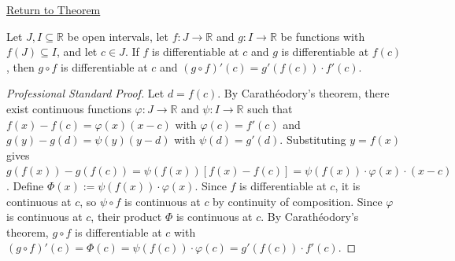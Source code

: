 \newpage
{}
\label{prf:chain-rule}

\begin{remark*}[Return]
\hyperref[thm:chain-rule]{Return to Theorem}
\end{remark*}

\begin{theorem*}
Let $J, I \subseteq \mathbb{R}$ be open intervals, let $f : J \to \mathbb{R}$ and $g : I \to \mathbb{R}$ be functions with $f(J) \subseteq I$, and let $c \in J$. If $f$ is differentiable at $c$ and $g$ is differentiable at $f(c)$, then $g \circ f$ is differentiable at $c$ and $(g \circ f)'(c) = g'(f(c)) \cdot f'(c)$.
\end{theorem*}

\begin{proof}[Professional Standard Proof]
\LRAProofBodyStart
Let $d = f(c)$. By Carath\'{e}odory's theorem, there exist continuous functions $\varphi : J \to \mathbb{R}$ and $\psi : I \to \mathbb{R}$ such that $f(x) - f(c) = \varphi(x)(x - c)$ with $\varphi(c) = f'(c)$ and $g(y) - g(d) = \psi(y)(y - d)$ with $\psi(d) = g'(d)$. Substituting $y = f(x)$ gives $g(f(x)) - g(f(c)) = \psi(f(x))[f(x) - f(c)] = \psi(f(x)) \cdot \varphi(x) \cdot (x - c)$. Define $\Phi(x) := \psi(f(x)) \cdot \varphi(x)$. Since $f$ is differentiable at $c$, it is continuous at $c$, so $\psi \circ f$ is continuous at $c$ by continuity of composition. Since $\varphi$ is continuous at $c$, their product $\Phi$ is continuous at $c$. By Carath\'{e}odory's theorem, $g \circ f$ is differentiable at $c$ with $(g \circ f)'(c) = \Phi(c) = \psi(f(c)) \cdot \varphi(c) = g'(f(c)) \cdot f'(c)$.
\end{proof}

